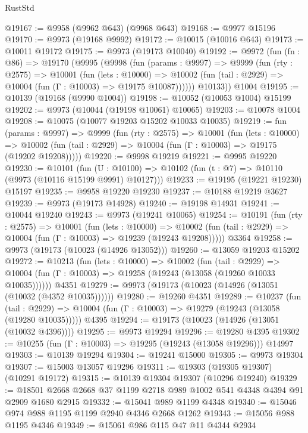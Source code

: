 \begin{lexlean}{RustStd}
\begin{coremodule}
@19167 := @9958 (@9962 @643) (@9968 @643)
@19168 := @9977 @15196
@19170 := @9973 (@19168 @9992)
@19172 := @10015 (@10016 @643)
@19173 := @10011 @19172
@19175 := @9973 (@19173 @10040)
@19192 := @9972
    (fun (fn : @86) =>
    @19170
      (@9995
        (@9998
          (fun (params : @9997) =>
          @9999
            (fun (rty : @2575) =>
            @10001
              (fun (lets : @10000) =>
              @10002 (fun (tail : @2929) => @10004 (fun (Γ : @10003) => @19175 @10087))))))
        @10133))
    @1004
@19195 := @10139 (@19168 (@9990 @1004))
@19198 := @10052 (@10053 @1004) @15199
@19202 := @9973 (@10044 (@19198 @10061) @10065)
@19203 := @10078 @1004
@19208 := @10075 (@10077 @19203 @15202 @10033 @10035)
@19219 := fun (params : @9997) =>
  @9999
    (fun (rty : @2575) =>
    @10001
      (fun (lets : @10000) =>
      @10002 (fun (tail : @2929) => @10004 (fun (Γ : @10003) => @19175 (@19202 @19208)))))
@19220 := @9998 @19219
@19221 := @9995 @19220
@19230 := @10101
    (fun (U : @10100) => @10102 (fun (t : @7) => @10110 (@9973 (@10116 @15199 @9991) @10127)))
@19233 := @19195 (@19221 @19230) @15197
@19235 := @9958 @19220 @19230
@19237 := @10188 @19219 @3627
@19239 := @9973 (@19173 @14928)
@19240 := @19198 @14931
@19241 := @10044 @19240
@19243 := @9973 (@19241 @10065)
@19254 := @10191
    (fun (rty : @2575) =>
    @10001
      (fun (lets : @10000) =>
      @10002 (fun (tail : @2929) => @10004 (fun (Γ : @10003) => @19239 (@19243 @19208)))))
    @3364
@19258 := @9973 (@19173 (@10023 (@14926 @13052)))
@19260 := @13059 @19203 @15202
@19272 := @10213
    (fun (lets : @10000) =>
    @10002
      (fun (tail : @2929) =>
      @10004 (fun (Γ : @10003) => @19258 (@19243 (@13058 (@19260 @10033 @10035))))))
    @4351
@19279 := @9973 (@19173 (@10023 (@14926 (@13051 (@10032 (@4352 @10035))))))
@19280 := @19260 @4351
@19289 := @10237
    (fun (tail : @2929) => @10004 (fun (Γ : @10003) => @19279 (@19243 (@13058 (@19280 @10035)))))
    @4395
@19294 := @19173 (@10023 (@14926 (@13051 (@10032 @4396))))
@19295 := @9973 @19294
@19296 := @19280 @4395
@19302 := @10255 (fun (Γ : @10003) => @19295 (@19243 (@13058 @19296))) @14997
@19303 := @10139 @19294
@19304 := @19241 @15000
@19305 := @9973 @19304
@19307 := @15003 @13057 @19296
@19311 := @19303 (@19305 @19307) (@10291 @19172)
@19315 := @10139 @19304 @19307 (@10296 @19240)
@19329 := @18501 @2668 @2668 @37 @1199 @2718 @989 @1002 @541 @4348 @4394 @91 @2909 @1680 @2915
@19332 := @15041 @989 @1199 @4348
@19340 := @15046 @974 @988 @1195 @1199 @2940 @4346 @2668 @1262
@19343 := @15056 @988 @1195 @4346
@19349 := @15061 @986 @115 @47 @11 @4344 @2934

\end{coremodule}
\end{lexlean}
